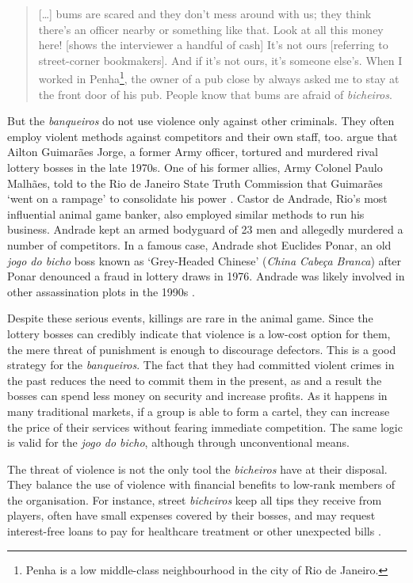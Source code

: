 \documentclass[a4paper,12pt]{article}
\begin{document}
\begin{quote}
 [\dots] bums are scared and they don't mess around with us; they think there's an officer nearby or something like that. Look at all this money here! [shows the interviewer a handful of cash] It's not ours [referring to street-corner bookmakers]. And if it's not ours, it's someone else's. When I worked in Penha\footnote{Penha is a low middle-class neighbourhood in the city of Rio de Janeiro.}, the owner of a pub close by always asked me to stay at the front door of his pub. People know that bums are afraid of \textit{bicheiros}.
\end{quote}

But the \textit{banqueiros} do not use violence only against other criminals. They often employ violent methods against competitors and their own staff, too. \citet{jupiara2015poroes} argue that Ailton Guimarães Jorge, a former Army officer, tortured and murdered rival lottery bosses in the late 1970s. One of his former allies, Army Colonel Paulo Malhães, told to the Rio de Janeiro State Truth Commission that Guimarães `went on a rampage' to consolidate his power \citep{belem2015guimaraes}. Castor de Andrade, Rio's most influential animal game banker, also employed similar methods to run his business. Andrade kept an armed bodyguard of 23 men and allegedly murdered a number of competitors. In a famous case, Andrade shot Euclides Ponar, an old \textit{jogo do bicho} boss known as `Grey-Headed Chinese' (\textit{China Cabe\c{c}a Branca}) after Ponar denounced a fraud in lottery draws in 1976. Andrade was likely involved in other assassination plots in the 1990s  \citep{globo2017castor}. 

Despite these serious events, killings are rare in the animal game. Since the lottery bosses can credibly indicate that violence is a low-cost option for them, the mere threat of punishment is enough to discourage defectors. This is a good strategy for the \textit{banqueiros}. The fact that they had committed violent crimes in the past reduces the need to commit them in the present, as and a result the bosses can spend less money on security and increase profits. As it happens in many traditional markets, if a group is able to form a cartel, they can increase the price of their services without fearing immediate competition. The same logic is valid for the \textit{jogo do bicho}, although through unconventional means.  

The threat of violence is not the only tool the \textit{bicheiros} have at their disposal. They balance the use of violence with financial benefits to low-rank members of the organisation. For instance, street \textit{bicheiros} keep all tips they receive from players, often have small expenses covered by their bosses, and may request interest-free loans to pay for healthcare treatment or other unexpected bills \citep{labronici2012paratodos}.
\end{document}
